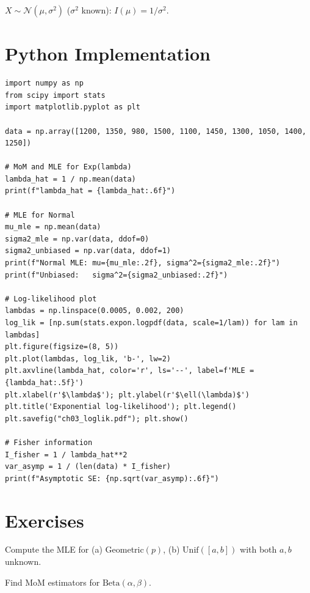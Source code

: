 \begin{example}
$X\sim\mathcal{N}(\mu,\sigma^2)$ ($\sigma^2$ known): $I(\mu)=1/\sigma^2$.
\end{example}

\section{Python Implementation}

\begin{python}
\begin{verbatim}
import numpy as np
from scipy import stats
import matplotlib.pyplot as plt

data = np.array([1200, 1350, 980, 1500, 1100, 1450, 1300, 1050, 1400, 1250])

# MoM and MLE for Exp(lambda)
lambda_hat = 1 / np.mean(data)
print(f"lambda_hat = {lambda_hat:.6f}")

# MLE for Normal
mu_mle = np.mean(data)
sigma2_mle = np.var(data, ddof=0)
sigma2_unbiased = np.var(data, ddof=1)
print(f"Normal MLE: mu={mu_mle:.2f}, sigma^2={sigma2_mle:.2f}")
print(f"Unbiased:   sigma^2={sigma2_unbiased:.2f}")

# Log-likelihood plot
lambdas = np.linspace(0.0005, 0.002, 200)
log_lik = [np.sum(stats.expon.logpdf(data, scale=1/lam)) for lam in lambdas]
plt.figure(figsize=(8, 5))
plt.plot(lambdas, log_lik, 'b-', lw=2)
plt.axvline(lambda_hat, color='r', ls='--', label=f'MLE = {lambda_hat:.5f}')
plt.xlabel(r'$\lambda$'); plt.ylabel(r'$\ell(\lambda)$')
plt.title('Exponential log-likelihood'); plt.legend()
plt.savefig("ch03_loglik.pdf"); plt.show()

# Fisher information
I_fisher = 1 / lambda_hat**2
var_asymp = 1 / (len(data) * I_fisher)
print(f"Asymptotic SE: {np.sqrt(var_asymp):.6f}")
\end{verbatim}
\end{python}

\section{Exercises}

\begin{exercise}[$\star$]
Compute the MLE for (a) Geometric$(p)$, (b) $\mathrm{Unif}([a,b])$ with both $a,b$ unknown.
\end{exercise}

\begin{exercise}[$\star$]
Find MoM estimators for $\mathrm{Beta}(\alpha,\beta)$.
\end{exercise}

